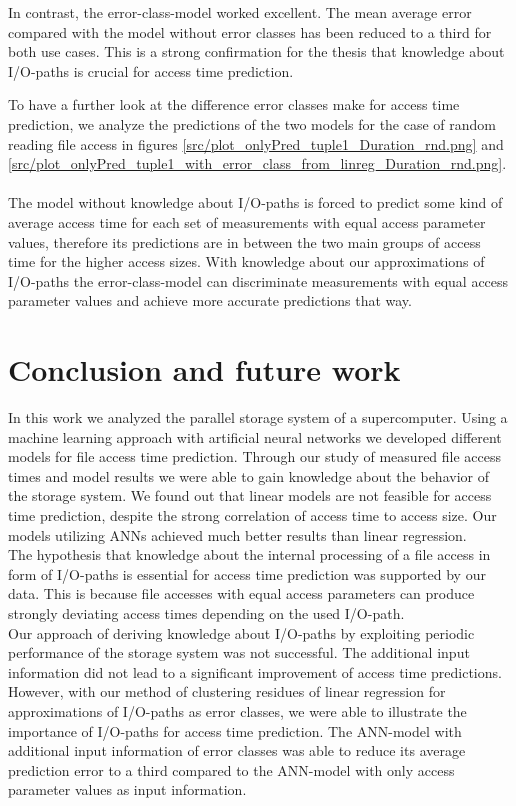 \documentclass{superfri}
\begin{document}
In contrast, the error-class-model worked excellent. The mean average error compared with the model without error classes has been reduced to a third for both use cases.
This is a strong confirmation for the thesis that knowledge about I/O-paths is crucial for access time prediction.\medskip

To have a further look at the difference error classes make for access time prediction, we analyze the predictions of the two models for the case of random reading file access in figures \ref{src/plot_onlyPred_tuple1_Duration_rnd.png} and \ref{src/plot_onlyPred_tuple1_with_error_class_from_linreg_Duration_rnd.png}.
\\
\\
The model without knowledge about I/O-paths is forced to predict some kind of average access time for each set of measurements with equal access parameter values, therefore its predictions are in between the two main groups of access time for the higher access sizes.
With knowledge about our approximations of I/O-paths the error-class-model can discriminate measurements with equal access parameter values and achieve more accurate predictions that way.

\section{Conclusion and future work}
In this work we analyzed the parallel storage system of a supercomputer.
Using a machine learning approach with artificial neural networks we developed different models for file access time prediction.
Through our study of measured file access times and model results we were able to gain knowledge about the behavior of the storage system.
We found out that linear models are not feasible for access time prediction, despite the strong correlation of access time to access size.
Our models utilizing ANNs achieved much better results than linear regression.\\
The hypothesis that knowledge about the internal processing of a file access in form of I/O-paths is essential for access time prediction was supported by our data.
This is because file accesses with equal access parameters can produce strongly deviating access times depending on the used I/O-path.\\
Our approach of deriving knowledge about I/O-paths by exploiting periodic performance of the storage system was not successful.
The additional input information did not lead to a significant improvement of access time predictions.\\
However, with our method of clustering residues of linear regression for approximations of I/O-paths as error classes, we were able to illustrate the importance of I/O-paths for access time prediction. The ANN-model with additional input information of error classes was able to reduce its average prediction error to a third compared to the ANN-model with only access parameter values as input information.\medskip
\end{document}
